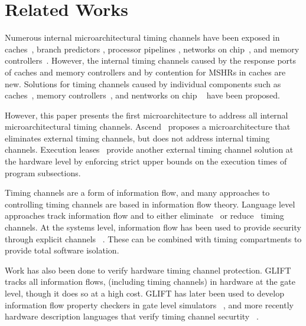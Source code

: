 \section{Related Works}
Numerous internal microarchitectural timing channels have been exposed in
caches~\cite{percival,bernstein,caseofaes,remoteaes,analyticalcache,collision,
deconstructing,cachegames}, branch predictors 
\cite{branchpred,predictingbranch}, processor
pipelines \cite{pipelines}, networks on chip~\cite{yaonocs,surfnoc}, and memory
controllers~\cite{ushpca14,fletcher-hpca14}. However, the internal timing 
channels caused by the response ports of caches and memory controllers and by 
contention for MSHRs in caches are new.  Solutions for timing channels caused 
by individual components such as caches~\cite{newcache,deconstructing}, memory
controllers~\cite{ushpca14,fletcher-hpca14}, and nentworks on chip 
~\cite{yaonocs,surfnoc} have
been proposed.

However, this paper presents the first microarchitecture to address all 
internal microarchitectural timing channels. Ascend~\cite{ascend} proposes a
microarchitecture that eliminates external timing channels, but does not
address internal timing channels. Execution leases~\cite{execution_leases} 
provide another external timing channel solution at the hardware level by 
enforcing strict upper bounds on the execution times of program subsections. 

Timing channels are a form of information flow, and many approaches to 
controlling timing channels are based in information flow theory. Language 
level approaches track information flow and to either 
eliminate~\cite{quantleaks} or 
reduce~\cite{mitigation1,mitigation2,mitigation3} timing channels. At the 
systems level, information flow has been used to provide security 
through explicit channels ~\cite{flume-sosp07,histar-sosp06,laminar-pldi09}. 
These can be combined with timing compartments to provide total software 
isolation.

Work has also been done to verify hardware timing channel protection. GLIFT 
\cite{glift-asplos09} tracks all information flows, (including timing channels) 
in hardware at the gate level, though it does so at a high cost. GLIFT has 
later been used to develop information flow property checkers in gate level 
simulators ~\cite{glift-dac10,glift-dac11,glift-isca11}, and more recently 
hardware description languages that verify timing channel securtity 
~\cite{caisson-plas10,caisson-pldi11,sapper-plas13}.
